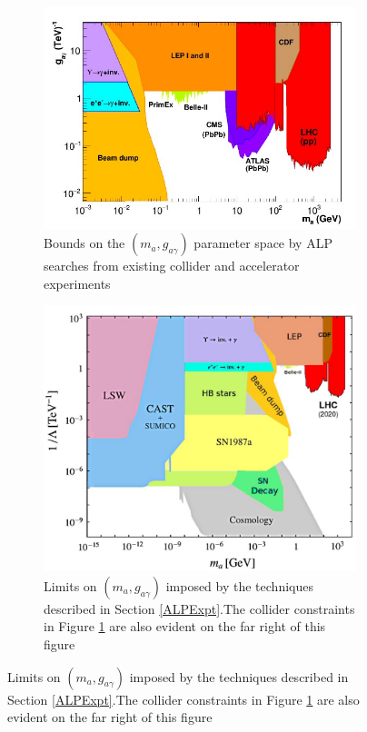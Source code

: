 \begin{figure}[H]
    \begin{subfigure}{0.4\textwidth}
    \includegraphics[scale = 0.77]{ALPColliderConstraints.jpg}
    \caption{Bounds on the $(m_{a}, g_{a\gamma})$ parameter space by ALP searches from existing collider and accelerator experiments}
    \label{ALPColliderConstraints}
    \end{subfigure}
    \hfill
    \begin{subfigure}{0.4\textwidth}
        \includegraphics[scale = 0.39]{ALPExperimentalAndColliderConstraints.jpg}
        \caption{Limits on $(m_{a},g_{a\gamma})$ imposed by the techniques described in Section \ref{ALPExpt}.The collider constraints in Figure \ref{ALPColliderConstraints} are also evident on the far right of this figure}
        \label{ALPExperimentalAndColliderConstraints}
    \end{subfigure}
    \hfill
\end{figure}

